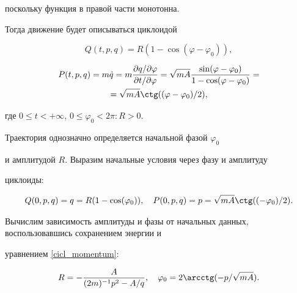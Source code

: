 поскольку функция в правой части монотонна.

 Тогда движение  будет описываться циклоидой

\begin{equation}

Q(t,p,q)= R(1-\cos(\varphi -\varphi_0)),

\label{cicl_coord}%

\end{equation}

\begin{multline}

P(t,p,q)= m\dot{q}=m\frac{\partial q/\partial\varphi}{\partial

t/\partial\varphi} =\sqrt{mA}\frac{\sin(\varphi

-\varphi_0)}{1-\cos(\varphi -\varphi_0)}=

\\

=\sqrt{mA}\ctg((\varphi

-\varphi_0)/2),

\label{cicl_momentum}

\end{multline}

где  $0\leqslant t  < +\infty$, $0\leqslant \varphi_0  < 2\pi : R>0$. 

Траектория однозначно определяется начальной фазой $\varphi_0$

и амплитудой $R$. Выразим начальные условия через фазу и амплитуду

циклоиды:

\begin{gather}

Q(0,p,q)=q= R(1-\cos(\varphi_0)),

\quad 

P(0,p,q)=p= \sqrt{mA}\ctg(( -\varphi_0)/2).

\end{gather}

 Вычислим зависимость амплитуды и фазы от начальных данных, воспользовавшись сохранением энергии и

уравнением \eqref{cicl_momentum}:

\begin{gather}

R=-\frac{A}{({2m})^{-1}p^2 -{A}/{q}},

\quad 

\varphi_0 =2\arcctg(-p/\sqrt{mA}).

\end{gather}

